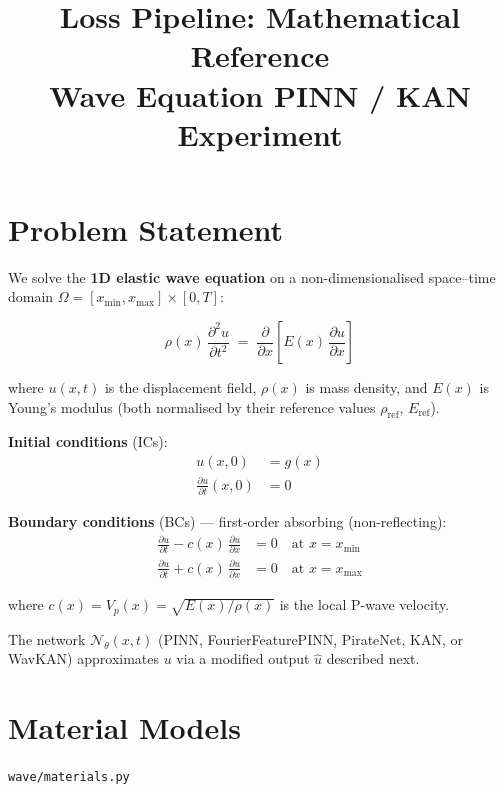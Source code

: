\documentclass[11pt, a4paper]{article}
\title{\textbf{Loss Pipeline: Mathematical Reference}\\[4pt]
       \large Wave Equation PINN / KAN Experiment}
\author{}
\date{}
\newcommand{\file}[1]{\texttt{#1}}
\begin{document}
\maketitle
\tableofcontents
\newpage

\section{Problem Statement}

We solve the \textbf{1D elastic wave equation} on a non-dimensionalised
space--time domain $\Omega = [x_{\min}, x_{\max}] \times [0, T]$:

\begin{equation}
  \boxed{
    \rho(x)\,\frac{\partial^2 u}{\partial t^2}
    \;=\;
    \frac{\partial}{\partial x}\!\left[E(x)\,\frac{\partial u}{\partial x}\right]
  }
  \label{eq:wave}
\end{equation}

where $u(x,t)$ is the displacement field, $\rho(x)$ is mass density, and
$E(x)$ is Young's modulus (both normalised by their reference values
$\rho_{\mathrm{ref}}$, $E_{\mathrm{ref}}$).

\textbf{Initial conditions} (ICs):
\begin{align}
  u(x, 0) &= g(x) \label{eq:ic_disp} \\
  \frac{\partial u}{\partial t}(x, 0) &= 0 \label{eq:ic_vel}
\end{align}

\textbf{Boundary conditions} (BCs) — first-order absorbing (non-reflecting):
\begin{align}
  \frac{\partial u}{\partial t} - c(x)\,\frac{\partial u}{\partial x} &= 0
  \quad \text{at } x = x_{\min} \label{eq:bc_left} \\
  \frac{\partial u}{\partial t} + c(x)\,\frac{\partial u}{\partial x} &= 0
  \quad \text{at } x = x_{\max} \label{eq:bc_right}
\end{align}

where $c(x) = V_p(x) = \sqrt{E(x)/\rho(x)}$ is the local P-wave velocity.

The network $\mathcal{N}_\theta(x,t)$ (PINN, FourierFeaturePINN, PirateNet, KAN,
or WavKAN) approximates $u$ via a modified output $\hat{u}$ described next.


\section{Material Models}
\file{wave/materials.py}
\end{document}

